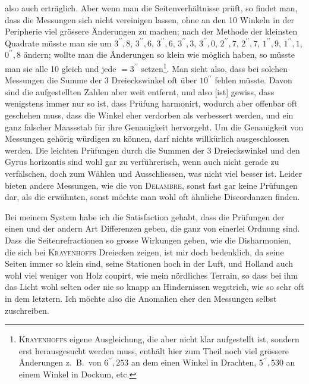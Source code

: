 \begingroup
\makeatletter
\renewcommand{\@makefnmark}{\hbox{\normalfont\textsuperscript{*})}}
\makeatother
\noindent also auch erträglich. Aber wenn man die Seitenverhältnisse prüft, so findet
man, dass die Messungen sich nicht vereinigen lassen, ohne an den 10 Winkeln
in der Peripherie viel grössere Änderungen zu machen; nach der Methode
der kleinsten Quadrate müsste man sie um $3^{\prime\prime}{,}8$, $3^{\prime\prime}{,}6$, $3^{\prime\prime}{,}6$, $3^{\prime\prime}{,}3$, $3^{\prime\prime}{,}0$, $2^{\prime\prime}{,}7$, $2^{\prime\prime}{,}7$,
$1^{\prime\prime}{,}9$, $1^{\prime\prime}{,}1$, $0^{\prime\prime}{,}8$ ändern; wollte man die Änderungen so klein wie möglich haben,
so müsste man sie alle 10 gleich und jede $=3^{\prime\prime}$ setzen\footnote{\textsc{Krayenhoffs} eigene Ausgleichung, die aber nicht klar aufgestellt ist, sondern erst herausgesucht werden muss, enthält hier zum Theil noch viel grössere Änderungen z.\ B.\ von $6^{\prime\prime}{,}253$ an dem einen Winkel in Drachten, $5^{\prime\prime}{,}530$ an einem Winkel in Dockum, etc.}. Man sieht also,
dass bei solchen Messungen die Summe der 3 Dreieckswinkel oft über $10^{\prime\prime}$
fehlen müsste. Davon sind die aufgestellten Zahlen aber weit entfernt, und
also [ist] gewiss, dass wenigstens immer nur so  ist, dass 
Prüfung harmonirt, wodurch aber offenbar oft geschehen muss, dass die
Winkel eher verdorben als verbessert werden, und ein ganz falscher Maassstab
für ihre Genauigkeit hervorgeht. Um die Genauigkeit von Messungen
gehörig würdigen zu können, darf nichts willkürlich ausgeschlossen werden.
Die leichten Prüfungen durch die Summen der 3 Dreieckswinkel und den
Gyrus horizontis sind wohl gar zu verführerisch, wenn auch nicht gerade zu
verfälschen, doch zum Wählen und Ausschliessen, was nicht viel besser ist.
Leider bieten andere Messungen, wie die von \textsc{Delambre}, sonst fast gar keine
Prüfungen dar, als die erwähnten, sonst möchte man wohl oft ähnliche
Discordanzen finden.

Bei meinem System habe ich die Satisfaction gehabt, dass die Prüfungen
der einen und der andern Art Differenzen geben, die ganz von einerlei Ordnung
sind. Dass die Seitenrefractionen so grosse Wirkungen geben, wie die
Disharmonien, die sich bei \textsc{Krayenhoffs} Dreiecken zeigen, ist mir doch bedenklich,
da seine Seiten immer so klein sind, seine Stationen hoch in der
Luft, und Holland auch wohl viel weniger von Holz coupirt, wie mein nördliches
Terrain, so dass bei ihm das Licht wohl selten oder nie so knapp an
Hindernissen wegstrich, wie so sehr oft in dem letztern. Ich möchte also die
Anomalien eher den Messungen selbst zuschreiben.
\endgroup
